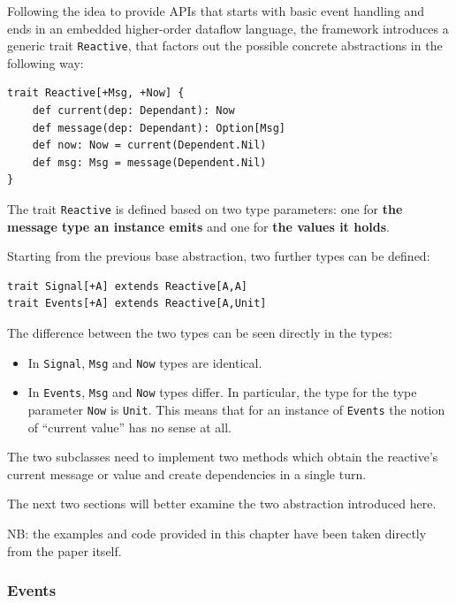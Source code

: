 Following the idea to provide APIs that starts with basic event handling
and ends in an embedded higher-order dataflow language, the framework
introduces a generic trait \texttt{Reactive}, that factors out the
possible concrete abstractions in the following way:

\begin{verbatim}
trait Reactive[+Msg, +Now] {
    def current(dep: Dependant): Now
    def message(dep: Dependant): Option[Msg]
    def now: Now = current(Dependent.Nil)
    def msg: Msg = message(Dependent.Nil)
}
\end{verbatim}

The trait \texttt{Reactive} is defined based on two type parameters: one
for \textbf{the message type an instance emits} and one for \textbf{the
values it holds}.

Starting from the previous base abstraction, two further types can be
defined:

\begin{verbatim}
trait Signal[+A] extends Reactive[A,A]
trait Events[+A] extends Reactive[A,Unit]
\end{verbatim}

The difference between the two types can be seen directly in the types:

\begin{itemize}
\itemsep1pt\parskip0pt
\item
  In \texttt{Signal}, \texttt{Msg} and \texttt{Now} types are identical.
\item
  In \texttt{Events}, \texttt{Msg} and \texttt{Now} types differ. In
  particular, the type for the type parameter \texttt{Now} is
  \texttt{Unit}. This means that for an instance of \texttt{Events} the
  notion of ``current value'' has no sense at all.
\end{itemize}

The two subclasses need to implement two methods which obtain the
reactive's current message or value and create dependencies in a single
turn.

The next two sections will better examine the two abstraction introduced
here.

NB: the examples and code provided in this chapter have been taken
directly from the paper itself.

\subsubsection{Events}\label{events}

